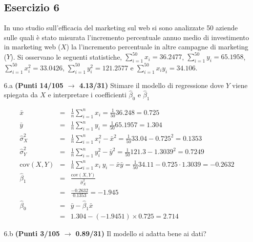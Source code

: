 \documentclass[
  11pt,
]{book}
\theoremstyle{mytheoremstyle}
\theoremstyle{mydefstyle}
\newenvironment{sol}
  {
  \begin{tcolorbox}[enhanced,breakable,arc=0.1mm,boxrule=1pt,colback=white,colframe=iblue,
  title=\bf \fontfamily{lmss}\selectfont \hspace{.5 cm} Soluzione,drop fuzzy shadow]

}{
\end{tcolorbox}
  }
\begin{document}
\subsection{Esercizio 6}\label{esercizio-6-26}

In uno studio sull'efficacia del marketing sul web si sono analizzate 50 aziende
sulle quali è stato misurata l'incremento percentuale annuo medio di investimento in marketing
web (\(X\)) la l'incremento percentuale in altre campagne di marketing (\(Y\)). Si osservano le seguenti statistiche, \(\sum_{i=1}^{50}x_i=36.2477\), \(\sum_{i=1}^{50}y_i=65.1958\),
\(\sum_{i=1}^{50}x_i^2=33.0426\), \(\sum_{i=1}^{50}y_i^2=121.2577\) e \(\sum_{i=1}^{50}x_iy_i=34.106\).

6.a \textbf{(Punti 14/105 \(\rightarrow\) 4.13/31)} Stimare il modello di regressione dove \(Y\) viene spiegata da \(X\) e interpretare
i coefficienti \(\hat\beta_0\) e \(\hat\beta_1\)

\begin{sol}
\begin{eqnarray*}
           \bar x &=&\frac 1 n\sum_{i=1}^n x_i = \frac {1}{ 50 }  36.248 =  0.725 \\
           \bar y &=&\frac 1 n\sum_{i=1}^n y_i = \frac {1}{ 50 }  65.1957 =  1.304 \\
           \hat\sigma_X^2&=&\frac 1 n\sum_{i=1}^n x_i^2-\bar x^2=\frac {1}{ 50 }  33.04  - 0.725 ^2= 0.1353 \\
           \hat\sigma_Y^2&=&\frac 1 n\sum_{i=1}^n y_i^2-\bar y^2=\frac {1}{ 50 }  121.3  - 1.3039 ^2= 0.7249 \\
           \text{cov}(X,Y)&=&\frac 1 n\sum_{i=1}^n x_i~y_i-\bar x\bar y=\frac {1}{ 50 }  34.11 - 0.725 \cdot 1.3039 = -0.2632 \\
           \hat\beta_1 &=& \frac{\text{cov}(X,Y)}{\hat\sigma_X^2} \\
                    &=& \frac{ -0.2632 }{ 0.1353 }  =  -1.945 \\
           \hat\beta_0 &=& \bar y - \hat\beta_1 \bar x\\
                    &=&  1.304 - (-1.9451) \times  0.725 = 2.714 
         \end{eqnarray*}

\end{sol}

6.b \textbf{(Punti 3/105 \(\rightarrow\) 0.89/31)} Il modello si adatta bene ai dati?
\end{document}
